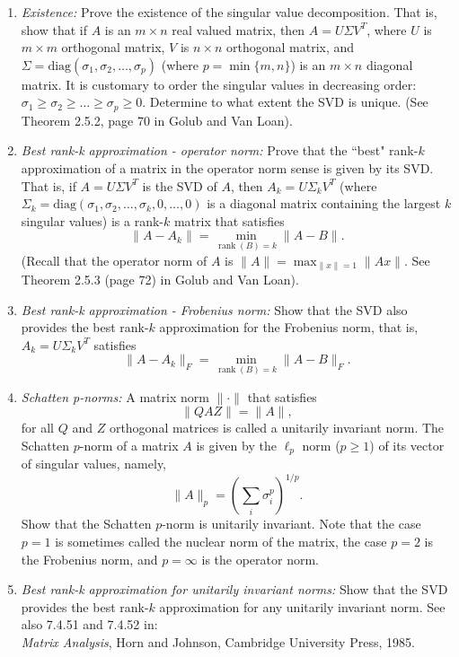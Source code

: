 \documentclass[11pt]{article}
\begin{document}
\begin{enumerate}
\begin{enumerate}

\item {\em Existence:} Prove the existence of the singular value decomposition. That is, show that if $A$ is an $m\times n$ real valued matrix, then $A = U\Sigma V^T$, where $U$ is $m\times m$ orthogonal matrix, $V$ is $n \times n$ orthogonal matrix, and $\Sigma = \text{diag}(\sigma_1,\sigma_2,\ldots,\sigma_p)$ (where $p=\min\{m,n\}$) is an $m\times n$ diagonal matrix. It is customary to order the singular values in decreasing order: $\sigma_1 \geq \sigma_2 \geq \ldots \geq \sigma_p \geq 0$. Determine to what extent the SVD is unique. (See Theorem 2.5.2, page 70 in Golub and Van Loan).

\item {\em Best rank-k approximation - operator norm:} Prove that the ``best" rank-$k$ approximation of a matrix in the operator norm sense is given by its SVD. That is, if $A = U\Sigma V^T$ is the SVD of $A$, then $A_k = U\Sigma_k V^T$ (where $\Sigma_k = \text{diag}(\sigma_1,\sigma_2,\ldots,\sigma_k,0,\ldots,0)$ is a diagonal matrix containing the largest $k$ singular values) is a rank-$k$ matrix that satisfies
    $$\|A-A_k\| = \min_{\operatorname{rank}(B)=k} \|A-B\|.$$ (Recall that the operator norm of $A$ is $\|A\| = \max_{\|x\|=1} \|Ax\|$. See Theorem 2.5.3 (page 72) in Golub and Van Loan).

\item {\em Best rank-k approximation - Frobenius norm:} Show that the SVD also provides the best rank-$k$ approximation for the Frobenius norm, that is, $A_k = U \Sigma_k V^T$ satisfies $$\|A-A_k\|_F = \min_{\operatorname{rank}(B)=k} \|A-B\|_F.$$

\item {\em Schatten p-norms:} A matrix norm $\| \cdot \|$ that satisfies
$$\|QAZ\| = \|A\|,$$
for all $Q$ and $Z$ orthogonal matrices is called a unitarily invariant norm. The Schatten $p$-norm of a matrix $A$ is given by the $\ell_p$ norm ($p\geq 1$) of its vector of singular values, namely, $$\|A\|_p = \left(\sum_{i} \sigma_i^p\right)^{1/p}.$$ Show that the Schatten $p$-norm is unitarily invariant. Note that the case $p=1$ is sometimes called the nuclear norm of the matrix, the case $p=2$ is the Frobenius norm, and $p=\infty$ is the operator norm.

\item {\em Best rank-k approximation for unitarily invariant norms:} Show that the SVD provides the best rank-$k$ approximation for any unitarily invariant norm. See also 7.4.51 and 7.4.52 in: \\
{\em Matrix Analysis}, Horn and Johnson, Cambridge University Press, 1985.


\end{enumerate}
\end{enumerate}
\end{document}
